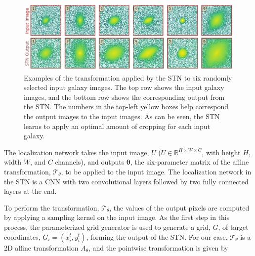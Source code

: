 \documentclass[twocolumn]{aastex63}
\begin{document}
\begin{CJK*}{UTF8}{gbsn}
\begin{figure}[htb]
    \centering
    \includegraphics[width
    =\textwidth]{stn_examples.png}
    \caption{Examples of the transformation applied by the STN to six randomly selected input galaxy images. The top row shows the input galaxy images, and the bottom row shows the corresponding output from the STN. The numbers in the top-left yellow boxes help correspond the output images to the input images. As can be seen, the STN learns to apply an optimal amount of cropping for each input galaxy.}
    \label{fig:stn_examples}
\end{figure}

The localization network takes the input image, $U$ ($U \in \mathbb{R}^{H \times W \times C}$, with height $H$, width $W$, and $C$ channels), and outputs $\boldsymbol{\theta}$, the six-parameter matrix of the affine transformation, $\mathcal{T}_\theta$, to be applied to the input image.
The localization network in the STN is a CNN with two convolutional layers followed by two fully connected layers at the end. 


To perform the transformation, $\mathcal{T}_\theta$, the values of the output pixels are computed by applying a sampling kernel on the input image. As the first step in this process, the parameterized grid generator is used to generate a grid, $G$, of target coordinates, $ G_i =  \left( x_i^t, y_i^t \right) $, forming the output of the STN. For our case, $\mathcal{T}_\theta$ is a 2D affine transformation $A_{\theta}$, and the pointwise transformation is given by


\end{CJK*}
\end{document}
